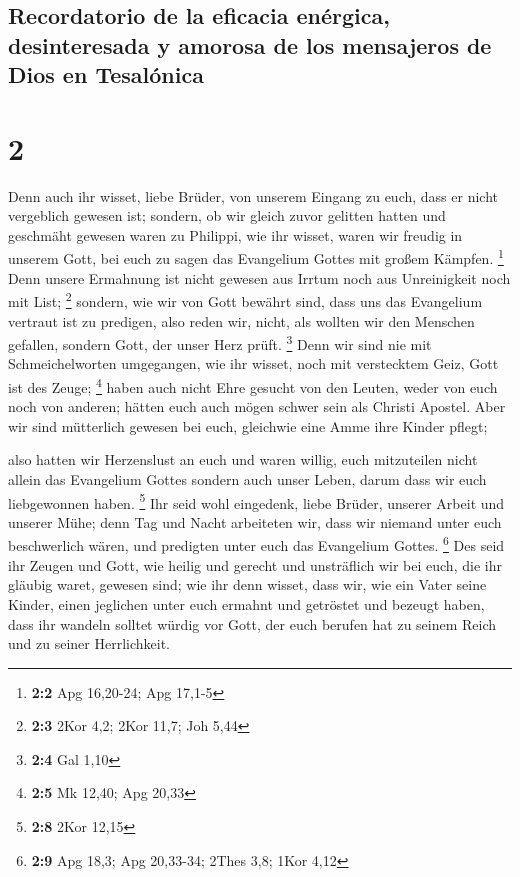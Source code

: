 \hypertarget{recordatorio-de-la-eficacia-enuxe9rgica-desinteresada-y-amorosa-de-los-mensajeros-de-dios-en-tesaluxf3nica}{%
\subsection{Recordatorio de la eficacia enérgica, desinteresada y
amorosa de los mensajeros de Dios en
Tesalónica}\label{recordatorio-de-la-eficacia-enuxe9rgica-desinteresada-y-amorosa-de-los-mensajeros-de-dios-en-tesaluxf3nica}}

\hypertarget{section-1}{%
\section{2}\label{section-1}}

 Denn auch ihr wisset, liebe Brüder, von unserem Eingang
zu euch, dass er nicht vergeblich gewesen ist;  sondern,
ob wir gleich zuvor gelitten hatten und geschmäht gewesen waren zu
Philippi, wie ihr wisset, waren wir freudig in unserem Gott, bei euch zu
sagen das Evangelium Gottes mit großem Kämpfen. \footnote{\textbf{2:2}
  Apg 16,20-24; Apg 17,1-5}  Denn unsere Ermahnung ist
nicht gewesen aus Irrtum noch aus Unreinigkeit noch mit List;
\footnote{\textbf{2:3} 2Kor 4,2; 2Kor 11,7; Joh 5,44} 
sondern, wie wir von Gott bewährt sind, dass uns das Evangelium vertraut
ist zu predigen, also reden wir, nicht, als wollten wir den Menschen
gefallen, sondern Gott, der unser Herz prüft. \footnote{\textbf{2:4} Gal
  1,10}  Denn wir sind nie mit Schmeichelworten
umgegangen, wie ihr wisset, noch mit verstecktem Geiz, Gott ist des
Zeuge; \footnote{\textbf{2:5} Mk 12,40; Apg 20,33}  haben
auch nicht Ehre gesucht von den Leuten, weder von euch noch von anderen;
 hätten euch auch mögen schwer sein als Christi Apostel.
Aber wir sind mütterlich gewesen bei euch, gleichwie eine Amme ihre
Kinder pflegt;

 also hatten wir Herzenslust an euch und waren willig,
euch mitzuteilen nicht allein das Evangelium Gottes sondern auch unser
Leben, darum dass wir euch liebgewonnen haben. \footnote{\textbf{2:8}
  2Kor 12,15}  Ihr seid wohl eingedenk, liebe Brüder,
unserer Arbeit und unserer Mühe; denn Tag und Nacht arbeiteten wir, dass
wir niemand unter euch beschwerlich wären, und predigten unter euch das
Evangelium Gottes. \footnote{\textbf{2:9} Apg 18,3; Apg 20,33-34; 2Thes
  3,8; 1Kor 4,12}  Des seid ihr Zeugen und Gott, wie
heilig und gerecht und unsträflich wir bei euch, die ihr gläubig waret,
gewesen sind;  wie ihr denn wisset, dass wir, wie ein
Vater seine Kinder, einen jeglichen unter euch ermahnt und getröstet
 und bezeugt haben, dass ihr wandeln solltet würdig vor
Gott, der euch berufen hat zu seinem Reich und zu seiner Herrlichkeit.

